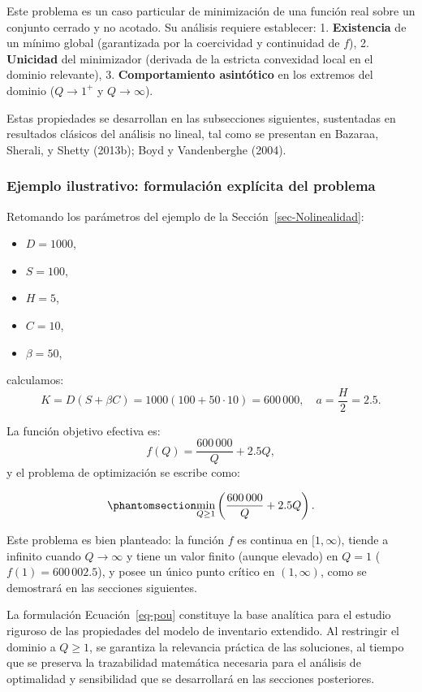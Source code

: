 \documentclass[
  spanish,
  us-letterpaper,
]{scrreprt}
\providecommand{\tightlist}{%
  \setlength{\itemsep}{0pt}\setlength{\parskip}{0pt}}
\numberwithin{equation}{section}
\begin{document}
Este problema es un caso particular de minimización de una función real
sobre un conjunto cerrado y no acotado. Su análisis requiere establecer:
1. \textbf{Existencia} de un mínimo global (garantizada por la
coercividad y continuidad de \(f\)), 2. \textbf{Unicidad} del
minimizador (derivada de la estricta convexidad local en el dominio
relevante), 3. \textbf{Comportamiento asintótico} en los extremos del
dominio (\(Q \to 1^+\) y \(Q \to \infty\)).

Estas propiedades se desarrollan en las subsecciones siguientes,
sustentadas en resultados clásicos del análisis no lineal, tal como se
presentan en Bazaraa, Sherali, y Shetty (2013b); Boyd y Vandenberghe
(2004).

\subsubsection{Ejemplo ilustrativo: formulación explícita del
problema}\label{ejemplo-ilustrativo-formulaciuxf3n-expluxedcita-del-problema}

Retomando los parámetros del ejemplo de la
Sección~\ref{sec-Nolinealidad}:

\begin{itemize}
\tightlist
\item
  \(D = 1000\),
\item
  \(S = 100\),
\item
  \(H = 5\),
\item
  \(C = 10\),
\item
  \(\beta = 50\),
\end{itemize}

calculamos: \[
K = D(S + \beta C) = 1000(100 + 50 \cdot 10) = 600\,000, \quad
a = \frac{H}{2} = 2.5.
\]

La función objetivo efectiva es: \[
f(Q) = \frac{600\,000}{Q} + 2.5 Q,
\] y el problema de optimización se escribe como:

\begin{equation}\phantomsection\label{eq-po}{
\min_{Q \geq 1} \left( \frac{600\,000}{Q} + 2.5 Q \right).
}\end{equation}

Este problema es bien planteado: la función \(f\) es continua en
\([1, \infty)\), tiende a infinito cuando \(Q \to \infty\) y tiene un
valor finito (aunque elevado) en \(Q=1\) (\(f(1) = 600\,002.5\)), y
posee un único punto crítico en \((1, \infty)\), como se demostrará en
las secciones siguientes.

La formulación Ecuación~\ref{eq-pou} constituye la base analítica para
el estudio riguroso de las propiedades del modelo de inventario
extendido. Al restringir el dominio a \(Q \geq 1\), se garantiza la
relevancia práctica de las soluciones, al tiempo que se preserva la
trazabilidad matemática necesaria para el análisis de optimalidad y
sensibilidad que se desarrollará en las secciones posteriores.
\end{document}

